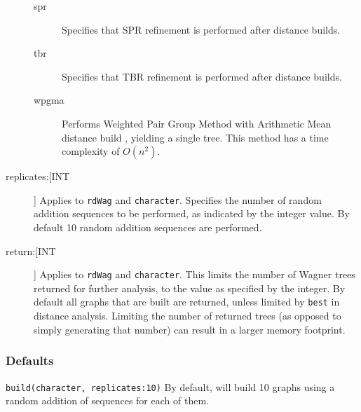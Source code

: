 \begin{description}
\begin{description}
			\item[spr] Specifies that SPR refinement \citep{Dayhoff1969} is performed 
			after distance builds.

			\item[tbr] Specifies that TBR refinement \citep{Farris1988, swofford1990a} 
			is performed after distance builds.
		
			\item[wpgma] Performs Weighted Pair Group Method with Arithmetic Mean 
			distance build \citep{SokalandMichener1958}, yielding a single tree. This method 
			has a time complexity of $O(n^2)$.
		\end{description}

		\item [replicates:[INT]] Applies to \texttt{rdWag} and \texttt{character}. Specifies the 
		number of random addition sequences to be performed, as indicated by the integer 
		value. By default 10 random addition sequences are performed.
		
		\item[return:[INT]] Applies to \texttt{rdWag} and \texttt{character}. This limits the 
			number of Wagner trees returned for further analysis, to the value as specified 
			by the integer. By default all graphs that are built are returned, unless limited 
			by \texttt{best} in distance analysis. Limiting the number of returned trees 
			(as opposed to simply generating that number) can result in a larger memory 
			footprint.
	\end{description}		

	\subsubsection{Defaults}
		\texttt{build(character, replicates:10)} By default, \phyg will build 10 graphs using 
		a random addition of sequences for each of them.
		
